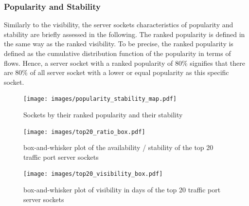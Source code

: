 \subsubsection{Popularity and Stability}
Similarly to the visibility, the \glspl{server socket} characteristics of popularity 
and stability are briefly assessed in the following. The ranked popularity is 
defined in the same way as the ranked visibility. To be precise, the ranked 
popularity is defined as the cumulative distribution function of the popularity 
in terms of flows. Hence, a \gls{server socket} with a ranked popularity of 80\% 
signifies that there are 80\% of all \gls{server socket} with a lower or equal 
popularity as this specific socket.



\begin{figure}
	[ht] \centering 
	\texttt{[image: images/popularity\_stability\_map.pdf]}
	\caption{Sockets by their ranked popularity and their stability} 
	\label{fig:rankedPopularity} 
\end{figure}

\begin{landscape}
	\begin{figure}
	[p] \centering 
	\texttt{[image: images/top20\_ratio\_box.pdf]}
	\caption{box-and-whisker plot of the availability / stability of the top 20 traffic port server sockets} 
	\label{fig:top20_ratio_box} 
\end{figure}
\end{landscape}

\begin{landscape}
\begin{figure}
	[p] \centering 
	\texttt{[image: images/top20\_visibility\_box.pdf]}
	\caption{box-and-whisker plot of visibility in days of the top 20 traffic port server sockets}
	\label{fig:top20_visibledays_box}
\end{figure}
\end{landscape}

